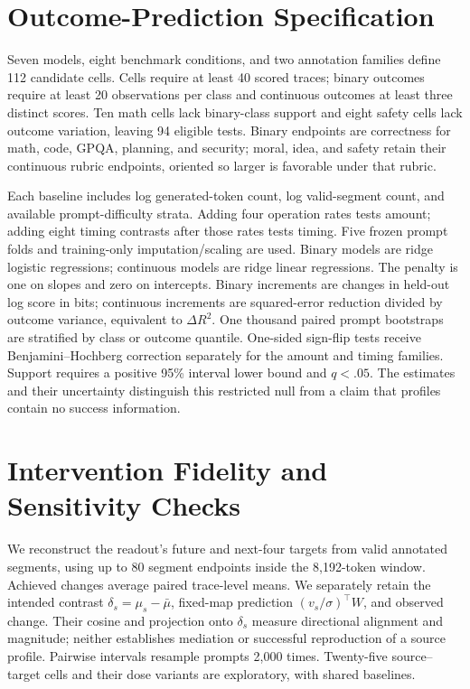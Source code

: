 \section{Outcome-Prediction Specification}
\label{app:outcome-spec}

Seven models, eight benchmark conditions, and two annotation families define 112 candidate cells. Cells require at least 40 scored traces; binary outcomes require at least 20 observations per class and continuous outcomes at least three distinct scores. Ten math cells lack binary-class support and eight safety cells lack outcome variation, leaving 94 eligible tests. Binary endpoints are correctness for math, code, GPQA, planning, and security; moral, idea, and safety retain their continuous rubric endpoints, oriented so larger is favorable under that rubric.

Each baseline includes log generated-token count, log valid-segment count, and available prompt-difficulty strata. Adding four operation rates tests amount; adding eight timing contrasts after those rates tests timing. Five frozen prompt folds and training-only imputation/scaling are used. Binary models are ridge logistic regressions; continuous models are ridge linear regressions. The penalty is one on slopes and zero on intercepts. Binary increments are changes in held-out log score in bits; continuous increments are squared-error reduction divided by outcome variance, equivalent to $\Delta R^2$. One thousand paired prompt bootstraps are stratified by class or outcome quantile. One-sided sign-flip tests receive Benjamini--Hochberg correction separately for the amount and timing families. Support requires a positive 95\% interval lower bound and $q<.05$. The estimates and their uncertainty distinguish this restricted null from a claim that profiles contain no success information.

\setcounter{dbltopnumber}{3}
\renewcommand{\dbltopfraction}{.95}
\renewcommand{\textfraction}{.03}
\section{Intervention Fidelity and Sensitivity Checks}
\label{app:fidelity}

We reconstruct the readout's future and next-four targets from valid annotated segments, using up to 80 segment endpoints inside the 8,192-token window. Achieved changes average paired trace-level means. We separately retain the intended contrast $\delta_s=\mu_s-\bar\mu$, fixed-map prediction $(v_s/\sigma)^\top W$, and observed change. Their cosine and projection onto $\delta_s$ measure directional alignment and magnitude; neither establishes mediation or successful reproduction of a source profile. Pairwise intervals resample prompts 2,000 times. Twenty-five source--target cells and their dose variants are exploratory, with shared baselines.

